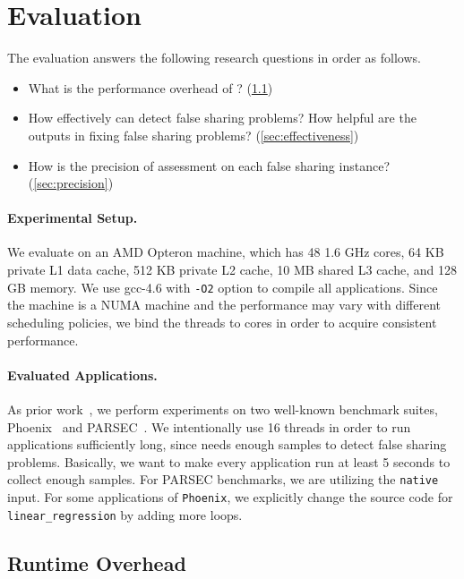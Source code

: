 \section{Evaluation}
\label{sec:eval}

\sloppy{}
The evaluation answers the following research questions in order as follows. 

\begin{itemize}
\item What is the performance overhead of \cheetah{}? (\ref{sec:perf})

\item How effectively can \cheetah{} detect false sharing problems? How helpful are the outputs in fixing false sharing problems? (\ref{sec:effectiveness})

\item How is the precision of assessment on each false sharing instance? (\ref{sec:precision})

\end{itemize}

\paragraph{Experimental Setup.} We evaluate \cheetah{} on an AMD Opteron machine, which has 48 1.6 GHz cores, 64 KB private L1 data cache, 512 KB private L2 cache, 10 MB shared L3 cache, and 128 GB memory. We use gcc-4.6 with {\tt -O2} option to compile all applications. Since the machine is a NUMA machine and the performance may vary with different scheduling policies, we bind the threads to cores in order to acquire consistent performance.   

\paragraph{Evaluated Applications.} As prior work~\cite{Sheriff, Predator, qinzhao, mldetect}, we perform experiments on two well-known benchmark suites, Phoenix~\cite{phoenix-hpca} and PARSEC~\cite{parsec}. We intentionally use 16 threads in order to run applications sufficiently long, since \cheetah{} needs enough samples to detect false sharing problems.  Basically, we want to make every application run at least 5 seconds to collect enough samples. For PARSEC benchmarks, we are utilizing the \texttt{native} input. For some applications of \texttt{Phoenix}, we explicitly change the source code for \texttt{linear\_regression} by adding more loops. 

\subsection{Runtime Overhead}
\label{sec:perf}

